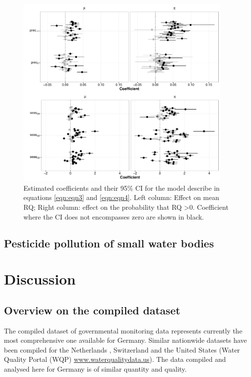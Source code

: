 \documentclass[journal=esthag,manuscript=article]{achemso}
\begin{document}
\begin{figure}[ht]
  \includegraphics[width=0.95\textwidth]{figure5.pdf}
  \caption{Estimated coefficients and their 95\% CI for the model describe in equations \ref{eqn:eqn3} and \ref{eqn:eqn4}. Left column: Effect on mean RQ; Right column: effect on the probability that RQ \textgreater 0.
  Coefficient where the CI does not encompasses zero are shown in black.
  }
  \label{fig:fig5}
\end{figure}

\subsection{Pesticide pollution of small water bodies}




\section{Discussion}
\subsection{Overview on the compiled dataset}
The compiled dataset of governmental monitoring data represents currently the most comprehensive one available for Germany.
Similar nationwide datasets have been compiled for the Netherlands \citep{vijver_spatial_2008}, Switzerland \citep{munz_pestizidmessungen_2011} and the United States (Water Quality Portal (WQP) \url{www.waterqualitydata.us}).
The data compiled and analysed here for Germany is of similar quantity and quality.
\end{document}
